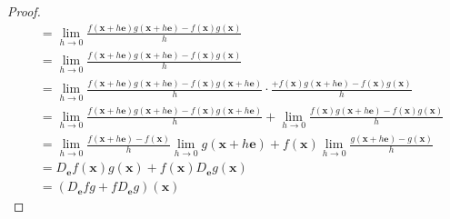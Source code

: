 \documentclass[dvipdfmx]{jsarticle}
\begin{document}
\begin{proof}
\begin{align*}
&= \lim_{h \rightarrow 0}\frac{f\left( \mathbf{x} + h\mathbf{e} \right)g\left( \mathbf{x} + h\mathbf{e} \right) - f\left( \mathbf{x} \right)g\left( \mathbf{x} \right)}{h}\\
&= \lim_{h \rightarrow 0}\frac{f\left( \mathbf{x} + h\mathbf{e} \right)g\left( \mathbf{x} + h\mathbf{e} \right) - f\left( \mathbf{x} \right)g\left( \mathbf{x} \right)}{h}\\
&= \lim_{h \rightarrow 0}{\frac{f\left( \mathbf{x} + h\mathbf{e} \right)g\left( \mathbf{x} + h\mathbf{e} \right) - f\left( \mathbf{x} \right)g\left( \mathbf{x} + h\mathbf{e} \right)}{h} \cdot \frac{+ f\left( \mathbf{x} \right)g\left( \mathbf{x} + h\mathbf{e} \right) - f\left( \mathbf{x} \right)g\left( \mathbf{x} \right)}{h}}\\
&= \lim_{h \rightarrow 0}\frac{f\left( \mathbf{x} + h\mathbf{e} \right)g\left( \mathbf{x} + h\mathbf{e} \right) - f\left( \mathbf{x} \right)g\left( \mathbf{x} + h\mathbf{e} \right)}{h} + \lim_{h \rightarrow 0}\frac{f\left( \mathbf{x} \right)g\left( \mathbf{x} + h\mathbf{e} \right) - f\left( \mathbf{x} \right)g\left( \mathbf{x} \right)}{h}\\
&= \lim_{h \rightarrow 0}\frac{f\left( \mathbf{x} + h\mathbf{e} \right) - f\left( \mathbf{x} \right)}{h}\lim_{h \rightarrow 0}{g\left( \mathbf{x} + h\mathbf{e} \right)} + f\left( \mathbf{x} \right)\lim_{h \rightarrow 0}\frac{g\left( \mathbf{x} + h\mathbf{e} \right) - g\left( \mathbf{x} \right)}{h}\\
&= D_{\mathbf{e}}f\left( \mathbf{x} \right)g\left( \mathbf{x} \right) + f\left( \mathbf{x} \right)D_{\mathbf{e}}g\left( \mathbf{x} \right)\\
&= \left( D_{\mathbf{e}}fg + fD_{\mathbf{e}}g \right)\left( \mathbf{x} \right)
\end{align*}
\end{proof}
\end{document}
